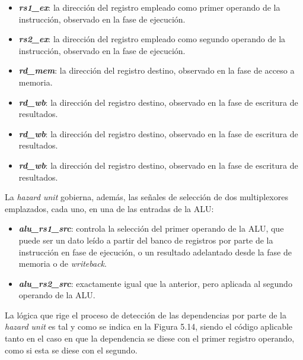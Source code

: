 \begin{itemize}
  \item \textbf{\textit{rs1\_ex}}: la dirección del registro empleado como primer operando de la instrucción, observado en la fase de ejecución.
  \vspace{-0.2cm}
  \item \textbf{\textit{rs2\_ex}}: la dirección del registro empleado como segundo operando de la instrucción, observado en la fase de ejecución.
  \vspace{-0.2cm}
  \item \textbf{\textit{rd\_mem}}: la dirección del registro destino, observado en la fase de acceso a memoria.
  \vspace{-0.2cm}
  \item \textbf{\textit{rd\_wb}}: la dirección del registro destino, observado en la fase de escritura de resultados.
  \vspace{-0.2cm}
  \item \textbf{\textit{rd\_wb}}: la dirección del registro destino, observado en la fase de escritura de resultados.
  \vspace{-0.2cm}
  \item \textbf{\textit{rd\_wb}}: la dirección del registro destino, observado en la fase de escritura de resultados.
\end{itemize}

La \textit{hazard unit} gobierna, además, las señales de selección de dos multiplexores emplazados, cada uno, en una de las entradas de la ALU:

\begin{itemize}
  \item \textbf{\textit{alu\_rs1\_src}}: controla la selección del primer operando de la ALU, que puede ser un dato leído a partir del banco de registros por parte de la instrucción en fase de ejecución, o un resultado adelantado desde la fase de memoria o de \textit{writeback}.
  \vspace{-0.2cm}
  \item \textbf{\textit{alu\_rs2\_src}}: exactamente igual que la anterior, pero aplicada al segundo operando de la ALU.
\end{itemize}

La lógica que rige el proceso de detección de las dependencias por parte de la \textit{hazard unit} es tal y como se indica en la Figura 5.14, siendo el código aplicable tanto en el caso en que la dependencia se diese con el primer registro operando, como si esta se diese con el segundo.

